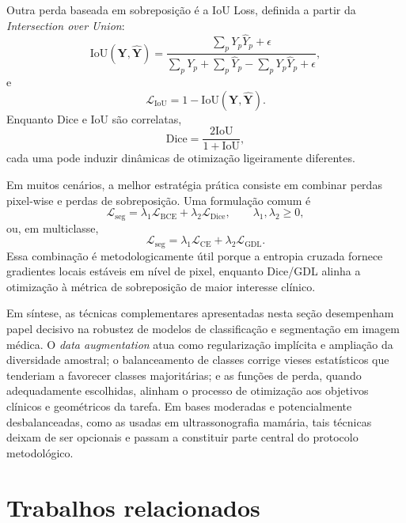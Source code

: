 \documentclass[tcc,capa]{texufpel}
\begin{document}
Outra perda baseada em sobreposição é a IoU Loss, definida a partir da \textit{Intersection over Union}:
\begin{equation}
	\mathrm{IoU}(\mathbf{Y},\hat{\mathbf{Y}})
	=
	\frac{\sum_p Y_p \hat{Y}_p + \epsilon}
	{\sum_p Y_p + \sum_p \hat{Y}_p - \sum_p Y_p \hat{Y}_p + \epsilon},
\end{equation}
e
\begin{equation}
	\mathcal{L}_{\text{IoU}} = 1 - \mathrm{IoU}(\mathbf{Y},\hat{\mathbf{Y}}).
\end{equation}
Enquanto Dice e IoU são correlatas,
\begin{equation}
	\mathrm{Dice} = \frac{2\mathrm{IoU}}{1+\mathrm{IoU}},
\end{equation}
cada uma pode induzir dinâmicas de otimização ligeiramente diferentes.

Em muitos cenários, a melhor estratégia prática consiste em combinar perdas pixel-wise e perdas de sobreposição. Uma formulação comum é
\begin{equation}
	\mathcal{L}_{\text{seg}}
	=
	\lambda_1 \mathcal{L}_{\text{BCE}}
	+
	\lambda_2 \mathcal{L}_{\text{Dice}},
	\qquad
	\lambda_1,\lambda_2 \ge 0,
\end{equation}
ou, em multiclasse,
\begin{equation}
	\mathcal{L}_{\text{seg}}
	=
	\lambda_1 \mathcal{L}_{\text{CE}}
	+
	\lambda_2 \mathcal{L}_{\text{GDL}}.
\end{equation}
Essa combinação é metodologicamente útil porque a entropia cruzada fornece gradientes locais estáveis em nível de pixel, enquanto Dice/GDL alinha a otimização à métrica de sobreposição de maior interesse clínico.

Em síntese, as técnicas complementares apresentadas nesta seção desempenham papel decisivo na robustez de modelos de classificação e segmentação em imagem médica. O \textit{data augmentation} atua como regularização implícita e ampliação da diversidade amostral; o balanceamento de classes corrige vieses estatísticos que tenderiam a favorecer classes majoritárias; e as funções de perda, quando adequadamente escolhidas, alinham o processo de otimização aos objetivos clínicos e geométricos da tarefa. Em bases moderadas e potencialmente desbalanceadas, como as usadas em ultrassonografia mamária, tais técnicas deixam de ser opcionais e passam a constituir parte central do protocolo metodológico.

\section{Trabalhos relacionados}
\end{document}
